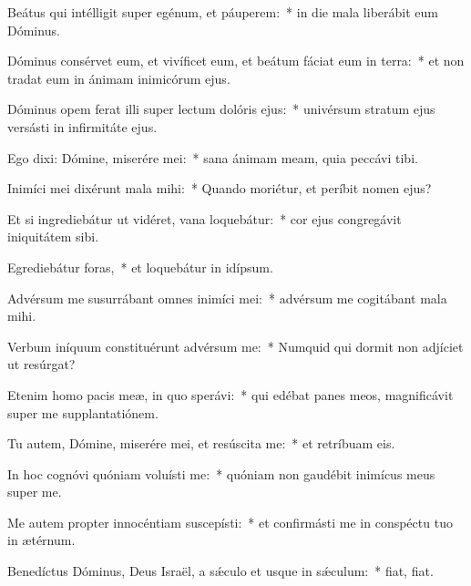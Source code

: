 \item Beátus qui intélligit super egénum, et páuperem:~* in die mala liberábit eum Dóminus.

\item Dóminus consérvet eum, et vivíficet eum, et beátum fáciat eum in terra:~* et non tradat eum in ánimam inimicórum ejus.

\item Dóminus opem ferat illi super lectum dolóris ejus:~* univérsum stratum ejus versásti in infirmitáte ejus.

\item Ego dixi: Dómine, miserére mei:~* sana ánimam meam, quia peccávi tibi.

\item Inimíci mei dixérunt mala mihi:~* Quando moriétur, et períbit nomen ejus?

\item Et si ingrediebátur ut vidéret, vana loquebátur:~* cor ejus congregávit iniquitátem sibi.

\item Egrediebátur foras,~* et loquebátur in idípsum.

\item Advérsum me susurrábant omnes inimíci mei:~* advérsum me cogitábant mala mihi.

\item Verbum iníquum constituérunt advérsum me:~* Numquid qui dormit non adjíciet ut resúrgat?

\item Etenim homo pacis meæ, in quo sperávi:~* qui edébat panes meos, magnificávit super me supplantatiónem.

\item Tu autem, Dómine, miserére mei, et resúscita me:~* et retríbuam eis.

\item In hoc cognóvi quóniam voluísti me:~* quóniam non gaudébit inimícus meus super me.

\item Me autem propter innocéntiam suscepísti:~* et confirmásti me in conspéctu tuo in ætérnum.

\item Benedíctus Dóminus, Deus Israël, a sǽculo et usque in sǽculum:~* fiat, fiat.

